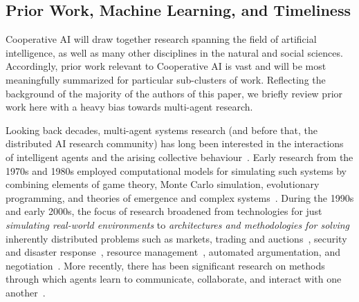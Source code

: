 \documentclass[11pt, a4paper, logo, onecolumn, nonumbering]{deepmind}
\begin{document}
\subsection{Prior Work, Machine Learning, and Timeliness} 
\label{l_sect_relation_to_mas}

Cooperative AI will draw together research spanning the field of artificial intelligence, as well as many other disciplines in the natural and social sciences. Accordingly, prior work relevant to Cooperative AI is vast and will be most meaningfully summarized for particular sub-clusters of work. Reflecting the background of the majority of the authors of this paper, we briefly review prior work here with a heavy bias towards multi-agent research. 

Looking back decades, multi-agent systems research  (and before that, the distributed AI research community)  has long been interested in the interactions of intelligent agents and the arising collective behaviour~\cite{weiss1999multiagent,ferber1999multi,jennings2000agent,padgham2005developing, dresner2004multiagent,shoham2008multiagent,wooldridge2009introduction,bordini2009multi,jennings1998roadmap}. 
Early research from the 1970s and 1980s employed 
computational models for simulating such systems by combining elements of game theory, Monte Carlo simulation, evolutionary programming, and theories of emergence and complex systems~\cite{schelling1971dynamic,axelrod1981evolution,reynolds1987flocks,minsky1988society}. During the 1990s and early 2000s, the focus of research broadened from technologies for just \emph{simulating real-world environments} to \emph{architectures and methodologies for solving} inherently distributed problems such as markets, trading and auctions~\cite{sandholm1996limitations,park1999adaptive,greenwald2001autonomous,nisan2001algorithmic,conitzer2002complexity,roughgarden2010algorithmic}, security and disaster response~\cite{schurr2005future,massaguer2006multi,tambe2011security,fang2015security}, resource management~\cite{pipattanasomporn2009multi,chevaleyre2005issues}, automated argumentation, and negotiation~\cite{rosenschein1994rules,sandholm1995issues,jennings2001automated,mcburney2002desiderata,kakas2006adaptive}. More recently, there has been significant research on methods through which agents learn to communicate, collaborate, and interact with one another~\cite{claus1998dynamics,stone2000multiagent,wagner2003progress,panait2005cooperative,zhang2010multi,lazaridou2016multi,havrylov2017emergence,al2017continuous}.
\end{document}
